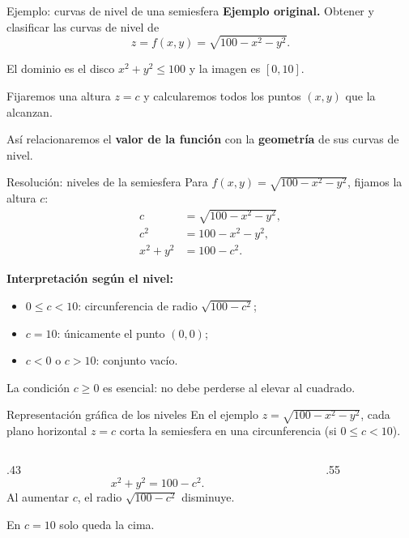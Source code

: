 \documentclass[main.tex]{subfiles}
\begin{document}
\begin{frame}{Ejemplo: curvas de nivel de una semiesfera}
\textbf{Ejemplo original.} Obtener y clasificar las curvas de nivel de
\[
z=f(x,y)=\sqrt{100-x^2-y^2}.
\]
\medskip

El dominio es el disco $x^2+y^2\le100$ y la imagen es $[0,10]$.
\medskip

Fijaremos una altura $z=c$ y calcularemos todos los puntos $(x,y)$ que la alcanzan.
\medskip

Así relacionaremos el \textbf{valor de la función} con la \textbf{geometría} de sus curvas de nivel.
\end{frame}
\begin{frame}{Resolución: niveles de la semiesfera}
Para $f(x,y)=\sqrt{100-x^2-y^2}$, fijamos la altura $c$:
\begin{align*}
c&=\sqrt{100-x^2-y^2},\\
c^2&=100-x^2-y^2,\\
x^2+y^2&=100-c^2.
\end{align*}
\medskip

\textbf{Interpretación según el nivel:}
\begin{itemize}
\item $0\le c<10$: circunferencia de radio $\sqrt{100-c^2}$;
\item $c=10$: únicamente el punto $(0,0)$;
\item $c<0$ o $c>10$: conjunto vacío.
\end{itemize}
\smallskip
\small La condición $c\ge0$ es esencial: no debe perderse al elevar al cuadrado.
\end{frame}
\begin{frame}{Representación gráfica de los niveles}
En el ejemplo $z=\sqrt{100-x^2-y^2}$, cada plano horizontal $z=c$ corta la semiesfera en una circunferencia (si $0\le c<10$).
\begin{columns}[c]
\begin{column}{.43\textwidth}
\[
x^2+y^2=100-c^2.
\]
\small
Al aumentar $c$, el radio $\sqrt{100-c^2}$ disminuye.
\medskip

En $c=10$ solo queda la cima.
\end{column}
\begin{column}{.55\textwidth}
\end{column}
\end{columns}
\end{frame}
\end{document}
